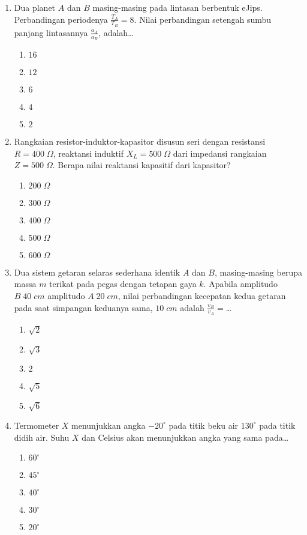 \documentclass[A4,12PT, english, twocolumn]{journal}
\begin{document}
\begin{enumerate}
\item Dua planet $A$ dan $B$ masing-masing pada lintasan berbentuk eJips. Perbandingan periodenya $\frac{T_A}{T_B}=8$. Nilai perbandingan setengah sumbu panjang lintasannya $\frac{a_A}{a_B}$, adalah\dots
    \begin{enumerate}
        \item $16$
        \item $12$
        \item $6$
        \item $4$
        \item $2$
    \end{enumerate}


\item Rangkaian resistor-induktor-kapasitor disusun seri dengan resistansi $R=400 \; \Omega$, reaktansi induktif $X_L=500 \; \Omega$ dari impedansi rangkaian $Z = 500 \; \Omega$. Berapa nilai reaktansi kapasitif dari kapasitor?
    \begin{enumerate}
        \item $200 \; \Omega$
        \item $300 \; \Omega$
        \item $400 \; \Omega$
        \item $500 \; \Omega$
        \item $600 \; \Omega$
    \end{enumerate}

\item Dua sistem getaran selaras sederhana identik $A$ dan $B$, masing-masing berupa massa $m$ terikat pada pegas dengan tetapan gaya $k$. Apabila amplitudo $B \; 40 \; cm$
amplitudo $A \; 20 \; cm$, nilai perbandingan kecepatan kedua getaran pada saat simpangan keduanya sama, $10 \; cm$ adalah $\frac{v_B}{v_A}=$\dots
    \begin{enumerate}
        \item $\sqrt{2}$
        \item $\sqrt{3}$
        \item $2$
        \item $\sqrt{5}$
        \item $\sqrt{6}$
    \end{enumerate}

\item Termometer $X$ menunjukkan angka $-20^\circ$ pada titik beku air $130^\circ$ pada titik didih air. Suhu $X$ dan Celsius akan menunjukkan angka yang sama pada\dots
    \begin{enumerate}
        \item $60^\circ$
        \item $45^\circ$
        \item $40^\circ$
        \item $30^\circ$
        \item $20^\circ$
    \end{enumerate}

\end{enumerate}
\end{document}
